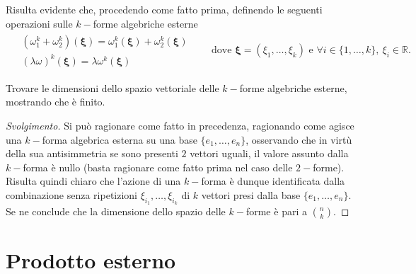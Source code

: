 Risulta evidente che, procedendo come fatto prima, definendo le seguenti operazioni sulle $k-$forme algebriche esterne
\begin{align*}
    \begin{aligned}
        &(\omega_1^k + \omega_2^k)(\boldsymbol{\xi}) = \omega_1^k(\boldsymbol{\xi}) + \omega_2^k(\boldsymbol{\xi}) \\
        &(\lambda \omega)^k(\boldsymbol{\xi}) = \lambda \omega^k(\boldsymbol{\xi})
    \end{aligned}
    \qquad \text{dove } \boldsymbol{\xi} = (\xi_1, \ldots, \xi_k) \text{ e } \forall i \in \{1, \ldots, k\},\ \xi_i \in \mathbb{R}.
\end{align*}
\begin{exercise}
    Trovare le dimensioni dello spazio vettoriale delle $k-$forme algebriche esterne, mostrando che è finito.
\end{exercise}
\begin{proof}[Svolgimento]
    Si può ragionare come fatto in precedenza, ragionando come agisce una $k-$forma algebrica esterna su una base $\{ e_1, \ldots, e_n \}$, osservando che in virtù della sua antisimmetria se sono presenti $2$ vettori uguali, il valore assunto dalla $k-$forma è nullo (basta ragionare come fatto prima nel caso delle $2-$forme). Risulta quindi chiaro che l'azione di una $k-$forma è dunque identificata dalla combinazione senza ripetizioni $\xi_{i_1}, \ldots, \xi_{i_k}$ di $k$ vettori presi dalla base $\{ e_1, \ldots, e_n \}$. Se ne conclude che la dimensione dello spazio delle $k-$forme è pari a $\binom{n}{k}$. 
\end{proof}
\section{Prodotto esterno}

